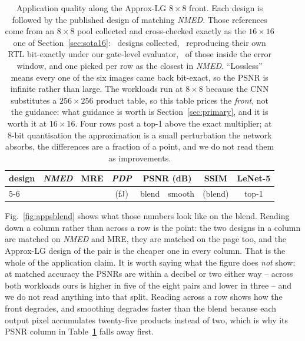 \documentclass[acmsmall,review,anonymous]{acmart}
\newcommand{\nmed}{\textit{NMED}}
\newcommand{\pdp}{\textit{PDP}}
\begin{document}
\begin{table}[t]
\caption{Application quality along the Approx-LG $8\times8$ front.  Each design
is followed by the published design of matching \nmed{}.  Those references come
from an $8\times8$ pool collected and cross-checked exactly as the $16\times16$
one of Section~\ref{sec:sota16}: \NlibEightTotal\ designs collected,
\NlibEightVerified\ reproducing their own RTL bit-exactly under our gate-level
evaluator, \NlibEightUsed\ of those inside the error window, and one picked per
row as the closest in \nmed{}.  ``Lossless'' means every one of the six images
came back bit-exact, so the PSNR is infinite rather than large.  The workloads
run at $8\times8$ because the CNN substitutes a $256\times256$ product table, so
this table prices the \emph{front}, not the guidance: what guidance is worth is
Section~\ref{sec:primary}, and it is worth it at $16\times16$.  Four rows post a
top-1 above the exact multiplier; at 8-bit quantisation the approximation is a
small perturbation the network absorbs, the differences are a fraction of a
point, and we do not read them as improvements.}
\label{tab:apps}
\centering\scriptsize
\setlength{\tabcolsep}{2.2pt}
\begin{tabular}{lccccccc}
\toprule
\multirow{2}{*}{design} & \multirow{2}{*}{\nmed{}} & \multirow{2}{*}{MRE} &
\pdp{} & \multicolumn{2}{c}{PSNR (dB)} & SSIM & LeNet-5\\
\cmidrule(lr){5-6}
 & & & (fJ) & blend & smooth & (blend) & top-1\\
\midrule

\bottomrule
\end{tabular}
\end{table}


Fig.~\ref{fig:appsblend} shows what those numbers look like on the blend.
Reading down a column rather than across a row is the point: the two designs in
a column are matched on \nmed{} and MRE, they are matched on the page too, and
the Approx-LG design of the pair is the cheaper one in every column.  That is
the whole of the application claim.  It is worth saying what the figure does
\emph{not} show: at matched accuracy the PSNRs are within a decibel or two
either way -- across both workloads ours is higher in five of the eight pairs
and lower in three -- and we do not read anything into that split.  Reading
across a row shows how the front degrades, and smoothing degrades faster than
the blend because each output pixel accumulates twenty-five products instead of
two, which is why its PSNR column in Table~\ref{tab:apps} falls away first.
\end{document}
